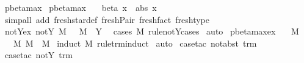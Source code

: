 \begin{isabellebody}
\isamarkupfalse%
\ pbeta{\isacharunderscore}max\isanewline
\isanewline
{}\isamarkupfalse%
\ pbeta{\isacharunderscore}max\isanewline
\ \ \ beta{\isacharcolon}\ {\isachardoublequoteopen}x{\isachardoublequoteclose}\ {\isacharbar}\ abs{\isacharcolon}\ {\isachardoublequoteopen}x{\isachardoublequoteclose}\ \isanewline
%
\isadelimproof
%
\endisadelimproof
%
\isatagproof
{}\isamarkupfalse%
\ {\isacharparenleft}simp{\isacharunderscore}all\ add{\isacharcolon}\ fresh{\isacharunderscore}star{\isacharunderscore}def\ fresh{\isacharunderscore}Pair\ fresh{\isacharunderscore}fact\ fresh{\isacharunderscore}type{\isacharparenright}%
\endisatagproof
{\isafoldproof}%
%
\isadelimproof
%
\endisadelimproof
\isanewline
\isanewline
{}\isamarkupfalse%
\ not{\isacharunderscore}Y{\isacharunderscore}ex{\isacharcolon}\ {\isachardoublequoteopen}{\isasymnot}{\isacharparenleft}not{\isacharunderscore}Y\ M{\isacharparenright}\ {\isasymLongrightarrow}\ {\isasymexists}{\isasymsigma}{\isachardot}\ M\ {\isacharequal}\ Y\ {\isasymsigma}{\isachardoublequoteclose}\isanewline
%
\isadelimproof
%
\endisadelimproof
%
\isatagproof
{}\isamarkupfalse%
\ {\isacharparenleft}cases\ M\ rule{\isacharcolon}not{\isacharunderscore}Y{\isachardot}cases{\isacharparenright}\isanewline
{}\isamarkupfalse%
\ auto%
\endisatagproof
{\isafoldproof}%
%
\isadelimproof
%
\endisadelimproof
%
\isamarkuptrue%
\isamarkupfalse%
\ pbeta{\isacharunderscore}max{\isacharunderscore}ex{\isacharcolon}\isanewline
\ \ \ M\isanewline
\ \ \ {\isachardoublequoteopen}{\isasymexists}M{\isacharprime}{\isachardot}\ M\ {\isachargreater}{\isachargreater}{\isachargreater}\ M{\isacharprime}{\isachardoublequoteclose}\isanewline
%
\isadelimproof
%
\endisadelimproof
%
\isatagproof
{}\isamarkupfalse%
\ {\isacharparenleft}induct\ M\ rule{\isacharcolon}trm{\isachardot}induct{\isacharparenright}\isanewline
{}\isamarkupfalse%
\ auto\isanewline
{}\isamarkupfalse%
\ {\isacharparenleft}case{\isacharunderscore}tac\ {\isachardoublequoteopen}not{\isacharunderscore}abst\ trm{}{\isachardoublequoteclose}{\isacharparenright}\isanewline
{}\isamarkupfalse%
\ {\isacharparenleft}case{\isacharunderscore}tac\ {\isachardoublequoteopen}not{\isacharunderscore}Y\ trm{}{\isachardoublequoteclose}{\isacharparenright}\isanewline
{}\isamarkupfalse%

\end{isabellebody}
